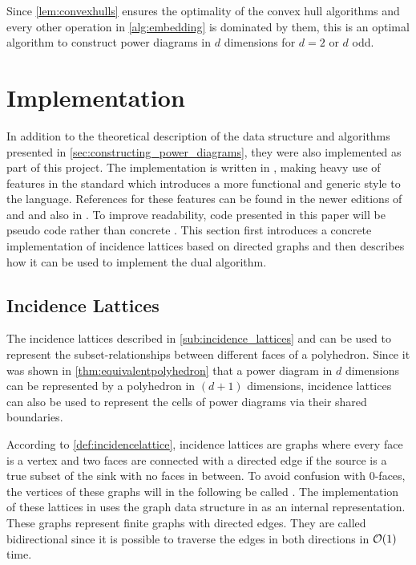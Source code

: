 Since \cref{lem:convexhulls} ensures the optimality of the convex hull algorithms and every other operation in \cref{alg:embedding} is dominated by them, this is an optimal algorithm to construct power diagrams in $d$ dimensions for $d = 2$ or $d$ odd.

\section{Implementation}
\label{sec:implementation}
In addition to the theoretical description of the data structure and algorithms presented in \cref{sec:constructing_power_diagrams}, they were also implemented as part of this project.
The implementation is written in \CC, making heavy use of features in the \CCe standard which introduces a more functional and generic style to the language.
References for these features can be found in the newer editions of \cite{stroustrup1986c++} and \cite{stroustrup2014programming} and also in \cite{meyers2014effective}.
To improve readability, code presented in this paper will be pseudo code rather than concrete \CC.
This section first introduces a concrete implementation of incidence lattices based on directed graphs and then describes how it can be used to implement the dual algorithm.

\subsection{Incidence Lattices}
\label{sub:impl_incidence_lattices}
The incidence lattices described in \cref{sub:incidence_lattices} and \cite{edelsbrunner1986constructing} can be used to represent the subset-relationships between different faces of a polyhedron.
Since it was shown in \cref{thm:equivalentpolyhedron} that a power diagram in $d$ dimensions can be represented by a polyhedron in $(d+1)$ dimensions, incidence lattices can also be used to represent the cells of power diagrams via their shared boundaries.

According to \cref{def:incidencelattice}, incidence lattices are graphs where every face is a vertex and two faces are connected with a directed edge if the source is a true subset of the sink with no faces in between.
To avoid confusion with $0$-faces, the vertices of these graphs will in the following be called .
The implementation of these lattices in  uses the graph data structure in  as an internal representation.
These graphs represent finite graphs with directed edges.
They are called bidirectional since it is possible to traverse the edges in both directions in $\mathcal{O}(1)$ time.

